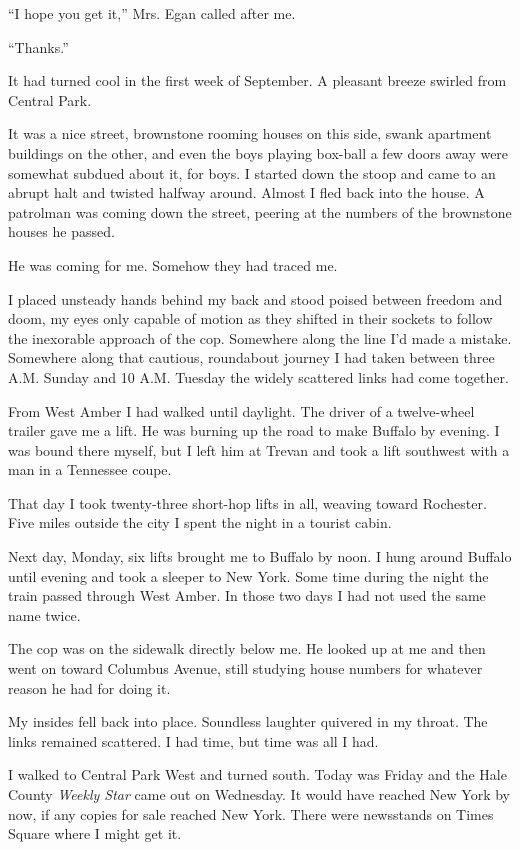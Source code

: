 \documentclass{novel}
\begin{document}
“I hope you get it,” Mrs. Egan called after me.

“Thanks.”

\scenestars

It had turned cool in the first week of September. A pleasant breeze swirled from Central Park.

It was a nice street, brownstone rooming houses on this side, swank apartment buildings on the other, and even the boys playing box-ball a few doors away were somewhat subdued about it, for boys. I started down the stoop and came to an abrupt halt and twisted halfway around. Almost I fled back into the house. A patrolman was coming down the street, peering at the numbers of the brownstone houses he passed.

He was coming for me. Somehow they had traced me.

I placed unsteady hands behind my back and stood poised between freedom and doom, my eyes only capable of motion as they shifted in their sockets to follow the inexorable approach of the cop. Somewhere along the line I’d made a mistake. Somewhere along that cautious, roundabout journey I had taken between three A.M. Sunday and 10 A.M. Tuesday the widely scattered links had come together.

From West Amber I had walked until daylight. The driver of a twelve-wheel trailer gave me a lift. He was burning up the road to make Buffalo by evening. I was bound there myself, but I left him at Trevan and took a lift southwest with a man in a Tennessee coupe.

That day I took twenty-three short-hop lifts in all, weaving toward Rochester. Five miles outside the city I spent the night in a tourist cabin.

Next day, Monday, six lifts brought me to Buffalo by noon. I hung around Buffalo until evening and took a sleeper to New York. Some time during the night the train passed through West Amber. In those two days I had not used the same name twice.

The cop was on the sidewalk directly below me. He looked up at me and then went on toward Columbus \mbox{Avenue}, still studying house numbers for whatever reason he had for doing it.

My insides fell back into place. Soundless laughter quivered in my throat. The links remained scattered. I had time, but time was all I had.

I walked to Central Park West and turned south. Today was Friday and the Hale County \textit{Weekly Star} came out on Wednesday. It would have reached New York by now, if any copies for sale reached New York. There were newsstands on Times Square where I might get it.
\end{document}
